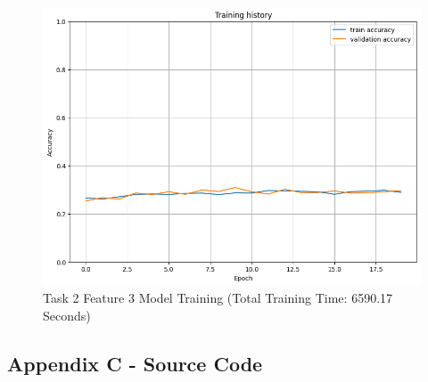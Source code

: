 \documentclass[10.7pt, onecolumn]{article}
\begin{document}
\begin{figure}[H]
  \centering
  \includegraphics[]{images/model2_task2_feature3_plot.png}
  \caption{Task 2 Feature 3 Model Training (Total Training Time: 6590.17 Seconds)}
  \label{fig:t2f3plot}
\end{figure}
\subsection{Appendix C - Source Code}



\end{document}
